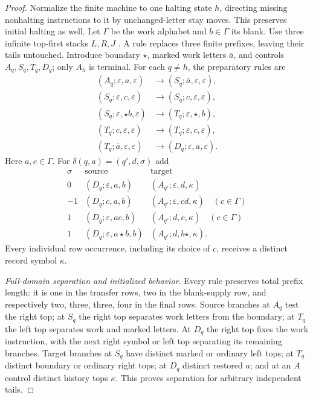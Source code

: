 \begin{proof}
Normalize the finite machine to one halting state $h$, directing missing
nonhalting instructions to it by unchanged-letter stay moves. This preserves
initial halting as well. Let $\Gamma$ be the work alphabet and
$b\in\Gamma$ its blank. Use three infinite top-first stacks $L,R,J$ \cite{Minsky1961,Minsky1967}.  A rule replaces three
finite prefixes, leaving their tails untouched.  Introduce boundary
$\star$, marked work letters $\bar a$, and controls $A_q,S_q,T_q,D_q$;
only $A_h$ is terminal.  For each $q\ne h$, the preparatory rules are
\begin{align}
 (A_q;\varepsilon,a,\varepsilon)&\to(S_q;\bar a,\varepsilon,\varepsilon),
 \label{eq:bb-balanced-entry}\\
 (S_q;\varepsilon,c,\varepsilon)&\to(S_q;c,\varepsilon,\varepsilon),
 \label{eq:bb-balanced-out-sweep}\\
 (S_q;\varepsilon,\star b,\varepsilon)&\to(T_q;\varepsilon,\star,b),
 \label{eq:bb-balanced-blank}\\
 (T_q;c,\varepsilon,\varepsilon)&\to(T_q;\varepsilon,c,\varepsilon),
 \label{eq:bb-balanced-return-sweep}\\
 (T_q;\bar a,\varepsilon,\varepsilon)&\to(D_q;\varepsilon,a,\varepsilon).
 \label{eq:bb-balanced-restore}
\end{align}
Here $a,c\in\Gamma$.  For $\delta(q,a)=(q',d,\sigma)$ add
\begin{equation}\label{eq:bb-balanced-step-table}
\begin{array}{c|c|c}
\sigma&\text{source}&\text{target}\\\hline
0&(D_q;\varepsilon,a,b)&(A_{q'};\varepsilon,d,\kappa)\\
-1&(D_q;c,a,b)&(A_{q'};\varepsilon,cd,\kappa)\quad(c\in\Gamma)\\
1&(D_q;\varepsilon,ac,b)&(A_{q'};d,c,\kappa)\quad(c\in\Gamma)\\
1&(D_q;\varepsilon,a\star b,b)&(A_{q'};d,b\star,\kappa).
\end{array}
\end{equation}
Every individual row occurrence, including its choice of $c$, receives
a distinct record symbol $\kappa$.

\emph{Full-domain separation and initialized behavior.}
\label{lem:bb-balanced-processor}\label{proof:bb-balanced-processor}
Every rule preserves total prefix length: it is one in the transfer
rows, two in the blank-supply row, and respectively two, three, three,
four in the final rows.  Source branches at $A_q$ test the right top;
at $S_q$ the right top separates work letters from the boundary;
at $T_q$ the left top separates work and marked letters.  At $D_q$
the right top fixes the work instruction, with the next right symbol
or left top separating its remaining branches.  Target branches at
$S_q$ have distinct marked or ordinary left tops; at $T_q$ distinct
boundary or ordinary right tops; at $D_q$ distinct restored $a$;
and at an $A$ control distinct history tops $\kappa$.
This proves separation for arbitrary independent tails.


\end{proof}
